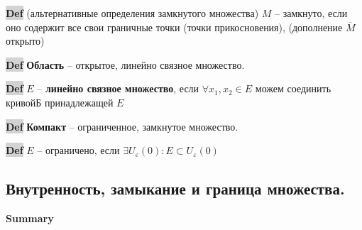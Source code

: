 \documentclass{article}
\newcommand{\bb}{\textbf}
\begin{document}
\begin{figure}[h!]
    \centering
\end{figure}

{\bfseries\colorbox{lightgray}{Def}} (альтернативные определения замкнутого множества) $M$ -- замкнуто, если оно содержит все свои граничные точки (точки прикосновения), (дополнение $\overline{M}$ открыто)

{\bfseries\colorbox{lightgray}{Def}} \bb{Область} -- открытое, линейно связное множество.

{\bfseries\colorbox{lightgray}{Def}} $E$ -- \bb{линейно связное множество}, если $\forall x_1, x_2 \in E$ можем соединить кривойБ принадлежащей $E$

{\bfseries\colorbox{lightgray}{Def}} \bb{Компакт} -- ограниченное, замкнутое множество.

{\bfseries\colorbox{lightgray}{Def}} $E$ -- ограничено, если $\exists U_\varepsilon(0) : E\subset U_\varepsilon(0)$

\begin{figure}[h!]
    \centering
    \vspace{-1cm}
\end{figure}
\subsection{Внутренность, замыкание и граница множества.}
\begin{figure}[h!]
    \centering
    \vspace{-1cm}
\end{figure}
\newpage\noindent
\bb{Summary}
\end{document}
